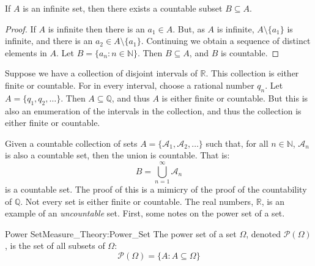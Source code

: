             \begin{theorem}
                If $A$ is an infinite set, then there exists a
                countable subset $B\subseteq{A}$.
            \end{theorem}
            \begin{proof}
                If $A$ is infinite then there is an
                $a_{1}\in{A}$. But, as $A$ is infinite,
                $A\setminus\{a_{1}\}$ is infinite, and there
                is an $a_{2}\in{A}\setminus\{a_{1}\}$. Continuing
                we obtain a sequence of distinct elements in $A$.
                Let $B=\{a_{n}:n\in\mathbb{N}\}$. Then
                $B\subseteq{A}$, and $B$ is countable.
            \end{proof}
            \begin{lexample}
                Suppose we have a collection of disjoint intervals
                of $\mathbb{R}$. This collection is either finite
                or countable. For in every interval, choose a
                rational number $q_{n}$. Let
                $A=\{q_{1},q_{2},\hdots\}$. Then
                $A\subseteq\mathbb{Q}$, and thus $A$ is either
                finite or countable. But this is also an enumeration
                of the intervals in the collection, and thus the
                collection is either finite or countable.
            \end{lexample}
            Given a countable collection of sets
            $A=\{\mathcal{A}_{1},\mathcal{A}_{2},\hdots\}$ such
            that, for all $n\in\mathbb{N}$, $\mathcal{A}_{n}$ is
            also a countable set, then the union is countable. That is:
            \begin{equation}
                B=\bigcup_{n=1}^{\infty}\mathcal{A}_{n}
            \end{equation}
            is a countable set. The proof of this is a mimicry of
            the proof of the countability of $\mathbb{Q}$. Not
            every set is either finite or countable. The real numbers,
            $\mathbb{R}$, is an example of an \textit{uncountable}
            set. First, some notes on the power set of a set.
            \begin{ldefinition}{Power Set}{Measure_Theory:Power_Set}
                The power set of a set $\Omega$, denoted $\mathcal{P}(\Omega)$,
                is the set of all subsets of $\Omega$:
                \begin{equation}
                    \mathcal{P}(\Omega)=\{A:A\subseteq\Omega\}
                \end{equation}
            \end{ldefinition}
